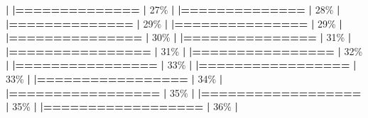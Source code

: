 \documentclass[
]{book}
\newenvironment{Shaded}{\begin{snugshade}}{\end{snugshade}}
\newcommand{\DecValTok}[1]{\textcolor[rgb]{0.00,0.00,0.81}{#1}}
\newcommand{\ErrorTok}[1]{\textcolor[rgb]{0.64,0.00,0.00}{\textbf{#1}}}
\newcommand{\NormalTok}[1]{#1}
\newcommand{\SpecialCharTok}[1]{\textcolor[rgb]{0.81,0.36,0.00}{\textbf{#1}}}
\begin{document}
\begin{Shaded}
\begin{Highlighting}[]
  \SpecialCharTok{|}                                                        
  \ErrorTok{|==============}                                    \ErrorTok{|}  \DecValTok{27}\NormalTok{\%}
  \SpecialCharTok{|}                                                        
  \ErrorTok{|==============}                                    \ErrorTok{|}  \DecValTok{28}\NormalTok{\%}
  \SpecialCharTok{|}                                                        
  \ErrorTok{|==============}                                    \ErrorTok{|}  \DecValTok{29}\NormalTok{\%}
  \SpecialCharTok{|}                                                        
  \ErrorTok{|===============}                                   \ErrorTok{|}  \DecValTok{29}\NormalTok{\%}
  \SpecialCharTok{|}                                                        
  \ErrorTok{|===============}                                   \ErrorTok{|}  \DecValTok{30}\NormalTok{\%}
  \SpecialCharTok{|}                                                        
  \ErrorTok{|===============}                                   \ErrorTok{|}  \DecValTok{31}\NormalTok{\%}
  \SpecialCharTok{|}                                                        
  \ErrorTok{|================}                                  \ErrorTok{|}  \DecValTok{31}\NormalTok{\%}
  \SpecialCharTok{|}                                                        
  \ErrorTok{|================}                                  \ErrorTok{|}  \DecValTok{32}\NormalTok{\%}
  \SpecialCharTok{|}                                                        
  \ErrorTok{|================}                                  \ErrorTok{|}  \DecValTok{33}\NormalTok{\%}
  \SpecialCharTok{|}                                                        
  \ErrorTok{|=================}                                 \ErrorTok{|}  \DecValTok{33}\NormalTok{\%}
  \SpecialCharTok{|}                                                        
  \ErrorTok{|=================}                                 \ErrorTok{|}  \DecValTok{34}\NormalTok{\%}
  \SpecialCharTok{|}                                                        
  \ErrorTok{|=================}                                 \ErrorTok{|}  \DecValTok{35}\NormalTok{\%}
  \SpecialCharTok{|}                                                        
  \ErrorTok{|==================}                                \ErrorTok{|}  \DecValTok{35}\NormalTok{\%}
  \SpecialCharTok{|}                                                        
  \ErrorTok{|==================}                                \ErrorTok{|}  \DecValTok{36}\NormalTok{\%}
  \SpecialCharTok{|}                                                        

\end{Highlighting}
\end{Shaded}
\end{document}
